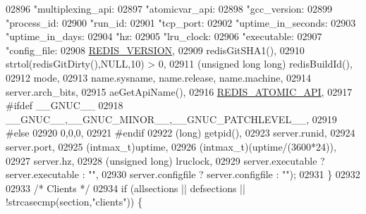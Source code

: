 \begin{DoxyCode}
{{{{{{{{{{{{{{{{{{{{{{{{{{{{{{{{{{{{{{{{{{{{{{{{02896             \textcolor{stringliteral}{"multiplexing\_api:%
02897             \textcolor{stringliteral}{"atomicvar\_api:%
02898             \textcolor{stringliteral}{"gcc\_version:%
02899             \textcolor{stringliteral}{"process\_id:%
02900             \textcolor{stringliteral}{"run\_id:%
02901             \textcolor{stringliteral}{"tcp\_port:%
02902             \textcolor{stringliteral}{"uptime\_in\_seconds:%
02903             \textcolor{stringliteral}{"uptime\_in\_days:%
02904             \textcolor{stringliteral}{"hz:%
02905             \textcolor{stringliteral}{"lru\_clock:%
02906             \textcolor{stringliteral}{"executable:%
02907             \textcolor{stringliteral}{"config\_file:%
02908             \hyperlink{version_8h_a357a0d302ef7fbb42bf2db0632b9f7fe}{REDIS\_VERSION},
02909             redisGitSHA1(),
02910             strtol(redisGitDirty(),NULL,10) > 0,
02911             (\textcolor{keywordtype}{unsigned} \textcolor{keywordtype}{long} \textcolor{keywordtype}{long}) redisBuildId(),
02912             mode,
02913             name.sysname, name.release, name.machine,
02914             server.arch\_bits,
02915             aeGetApiName(),
02916             \hyperlink{atomicvar_8h_ae3aa976bb329a4a554a853c5770c3e3d}{REDIS\_ATOMIC\_API},
02917 \textcolor{preprocessor}{#}\textcolor{preprocessor}{ifdef} \_\_GNUC\_\_
02918             \_\_GNUC\_\_,\_\_GNUC\_MINOR\_\_,\_\_GNUC\_PATCHLEVEL\_\_,
02919 \textcolor{preprocessor}{#}\textcolor{preprocessor}{else}
02920             0,0,0,
02921 \textcolor{preprocessor}{#}\textcolor{preprocessor}{endif}
02922             (\textcolor{keywordtype}{long}) getpid(),
02923             server.runid,
02924             server.port,
02925             (intmax\_t)uptime,
02926             (intmax\_t)(uptime/(3600*24)),
02927             server.hz,
02928             (\textcolor{keywordtype}{unsigned} \textcolor{keywordtype}{long}) lruclock,
02929             server.executable ? server.executable : \textcolor{stringliteral}{""},
02930             server.configfile ? server.configfile : \textcolor{stringliteral}{""});
02931     \}
02932 
02933     \textcolor{comment}{/* Clients */}
02934     \textcolor{keywordflow}{if} (allsections || defsections || !strcasecmp(section,\textcolor{stringliteral}{"clients"})) \{
}}}}}}}}}}}}}}}}}}}}}}}}}}}}}}}}}}}}}}}}}}}}}}}}}}}}}}}}}}}}
\end{DoxyCode}
